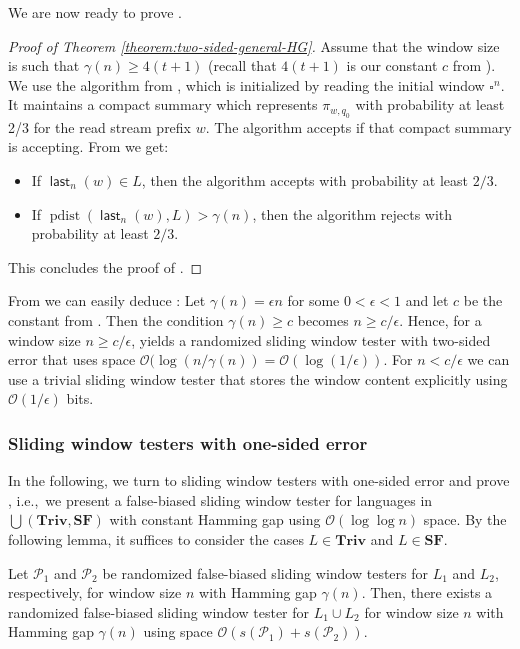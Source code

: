 \documentclass{theoretics}
\renewcommand{\O}{\mathcal{O}}
\renewcommand{\P}{\mathcal{P}}
\DeclareMathOperator{\last}{\mathsf{last}}
\DeclareMathOperator{\pdist}{pdist}
\newcommand{\Triv}{\mathbf{Triv}}
\newcommand{\SF}{\mathbf{SF}}
\renewcommand{\geq}{\geqslant}
\renewcommand{\ge}{\geq}
\begin{document}
We are now ready to prove .

\begin{proof}[Proof of Theorem \ref{theorem:two-sided-general-HG}]
Assume that the window size is such that $\gamma(n) \ge 4(t+1)$ (recall that $4(t+1)$ is our constant $c$ from ).
We use the algorithm from , which is initialized by reading the initial window $\square^n$.
It maintains a compact summary which represents $\pi_{w,q_0}$ with probability at least 2/3
for the read stream prefix $w$.
The algorithm accepts if that compact summary is accepting.
From  
we get:
\begin{itemize}
\item If $\last_n(w) \in L$, then the algorithm accepts with probability at least $2/3$.
\item If $\pdist(\last_n(w),L) > \gamma(n)$, then the algorithm rejects with probability at least $2/3$.
\end{itemize}
This concludes the proof of .
\end{proof}
From  we can easily deduce : 
Let $\gamma(n) = \epsilon n$ for some $0 < \epsilon < 1$ and let $c$ be the constant from 
. Then the condition $\gamma(n) \ge c$ becomes $n \geq c/\epsilon$.
Hence, for a window size $n \geq c/\epsilon$,  yields a randomized
sliding window tester with two-sided error that uses space $\O(\log(n/\gamma(n)) = \O(\log(1/\epsilon))$.
For $n < c/\epsilon$ we can use a trivial sliding window tester that stores the window content explicitly using
$\O(1/\epsilon)$ bits.


\subsubsection{Sliding window testers with one-sided error}\label{sec:one-sided_ub}

In the following, we turn to sliding window testers with one-sided error
and prove , i.e.,~we present a false-biased sliding window tester
for languages in $\bigcup(\Triv, \SF)$ with constant Hamming gap using $\O(\log \log n)$ space.
By the following lemma, it suffices to consider the cases $L \in \Triv$ and $L \in \SF$.

\begin{lemma}
	\label{lem:pt-union}
	Let $\P_1$ and $\P_2$ be randomized false-biased sliding window testers for $L_1$ and $L_2$, respectively,
	for window size $n$ with Hamming gap $\gamma(n)$.
	Then, there exists a randomized false-biased sliding window tester for $L_1 \cup L_2$ for window size $n$
	with Hamming gap $\gamma(n)$ using space $\O(s(\P_1) + s(\P_2))$.
\end{lemma}
\end{document}
